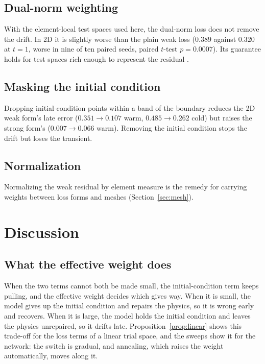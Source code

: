 \documentclass[a4paper,fleqn]{cas-sc}
\begin{document}
\subsection{Dual-norm weighting}
With the element-local test spaces used here, the dual-norm loss \cite{rojas2024rvpinn}
does not remove the drift.
In 2D it is slightly worse than the plain weak loss ($0.389$ against $0.320$ at $t=1$, worse in nine of ten paired seeds,
paired $t$-test $p=0.0007$). Its guarantee holds for test spaces rich enough to represent the residual \cite{rojas2024rvpinn}.

\subsection{Masking the initial condition}
Dropping initial-condition points within a band of the boundary
\cite{stiffreview} reduces the 2D weak form's late error ($0.351\to0.107$ warm, $0.485\to0.262$ cold) but raises the strong
form's ($0.007\to0.066$ warm). Removing the initial condition stops the drift but loses the transient.

\subsection{Normalization}
Normalizing the weak residual by element measure is the remedy for carrying weights between
loss forms and meshes (Section~\ref{sec:mesh}).

\section{Discussion}
\label{sec:discussion}

\subsection{What the effective weight does}
When the two terms cannot both be made small, the initial-condition term keeps
pulling, and the effective weight decides which gives way. When it is small, the model gives up the initial condition
and repairs the physics, so it is wrong early and recovers. When it is large, the model holds the initial condition and
leaves the physics unrepaired, so it drifts late. Proposition~\ref{prop:linear} shows this trade-off for the loss terms
of a linear trial space, and the sweeps show it for the network: the switch is gradual, and annealing, which raises the
weight automatically, moves along it.
\end{document}
